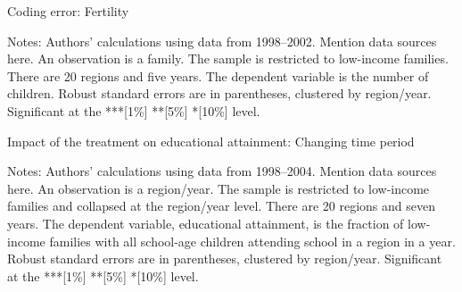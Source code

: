 \documentclass[12pt,a4paper]{article}
\begin{document}
\begin{footnotesize}



\begin{table}[H]
   \centering
   \caption{Coding error: Fertility} \label{tab:table1}
   \begin{threeparttable}
         \footnotesize 
     
        \begin{tablenotes}
        \scriptsize 
        \item{Notes: Authors’ calculations using data from 1998--2002. Mention data sources here. An observation is a family. The sample is restricted to low-income families. There are 20 regions and five years. The dependent variable is the number of children. Robust standard errors are in parentheses, clustered by region/year. Significant at the ***[1\%] **[5\%] *[10\%] level.
}
        \end{tablenotes}  
   \end{threeparttable}                          
\end{table}



\begin{table}[H]
   \centering
   \caption{Impact of the treatment on educational attainment: Changing time period} \label{tab:table2}
   \begin{threeparttable}
         \footnotesize 
     
        \begin{tablenotes}
        \scriptsize 
        \item{Notes: Authors’ calculations using data from 1998--2004. Mention data sources here. An observation is a region/year. The sample is restricted to low-income families and collapsed at the region/year level. There are 20 regions and seven years. The dependent variable, educational attainment, is the fraction of low-income families with all school-age children attending school in a region in a year. Robust standard errors are in parentheses, clustered by region/year. Significant at the ***[1\%] **[5\%] *[10\%] level.
}
        \end{tablenotes}  
   \end{threeparttable}                          
\end{table}



\end{footnotesize}
\end{document}
